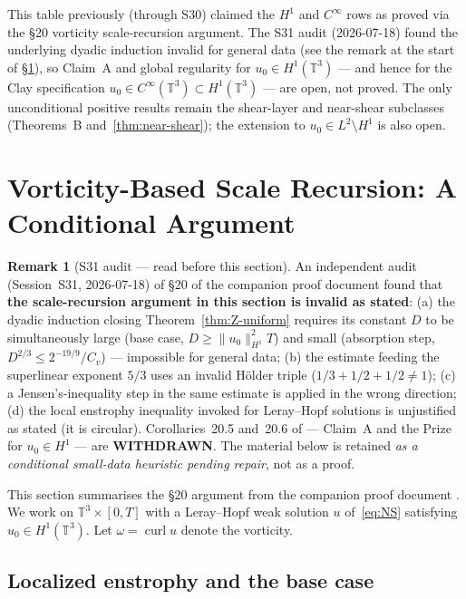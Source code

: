 \documentclass[11pt]{article}
\theoremstyle{definition}
\newtheorem{remark}[theorem]{Remark}
\theoremstyle{remark}
\newcommand{\T}{\mathbb{T}}
\newcommand{\curl}{\operatorname{curl}}
\begin{document}
This table previously (through S30) claimed the $H^1$ and $C^\infty$ rows as
proved via the §20 vorticity scale-recursion argument.  The S31 audit
(2026-07-18) found the underlying dyadic induction invalid for general data
(see the remark at the start of §\ref{sec:vorticity-recursive}), so Claim~A
and global regularity for $u_0\in H^1(\T^3)$ — and hence for the Clay
specification $u_0\in C^\infty(\T^3)\subset H^1(\T^3)$ — are open, not proved.
The only unconditional positive results remain the shear-layer and
near-shear subclasses (Theorems~B and~\ref{thm:near-shear}); the extension
to $u_0\in L^2\setminus H^1$ is also open.

\section{Vorticity-Based Scale Recursion: A Conditional Argument}
\label{sec:vorticity-recursive}

\begin{remark}[S31 audit --- read before this section]
An independent audit (Session~S31, 2026-07-18) of §20 of the companion proof
document \cite{TFirstProof2026} found that \textbf{the scale-recursion argument
in this section is invalid as stated}: (a) the dyadic induction closing
Theorem~\ref{thm:Z-uniform} requires its constant $D$ to be simultaneously
large (base case, $D\geq\|u_0\|_{H^1}^2T$) and small (absorption step,
$D^{2/3}\leq 2^{-19/9}/C_v$) --- impossible for general data; (b) the estimate
feeding the superlinear exponent $5/3$ uses an invalid H\"older triple
($1/3+1/2+1/2\neq1$); (c) a Jensen's-inequality step in the same estimate is
applied in the wrong direction; (d) the local enstrophy inequality invoked for
Leray--Hopf solutions is unjustified as stated (it is circular).  Corollaries~20.5
and~20.6 of \cite{TFirstProof2026} --- Claim~A and the Prize for $u_0\in H^1$ ---
are \textbf{WITHDRAWN}.  The material below is retained \emph{as a conditional
small-data heuristic pending repair}, not as a proof.
\end{remark}

This section summarises the §20 argument from the companion proof document
\cite{TFirstProof2026}.  We work on $\T^3\times[0,T]$ with a Leray--Hopf
weak solution $u$ of~\eqref{eq:NS} satisfying $u_0\in H^1(\T^3)$.
Let $\omega=\curl u$ denote the vorticity.

\subsection{Localized enstrophy and the base case}
\end{document}
